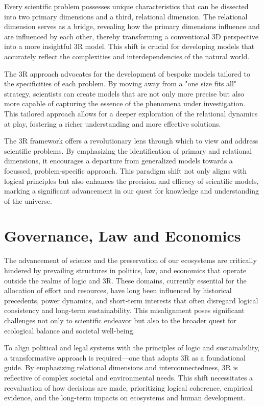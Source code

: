 \documentclass[12pt]{article}
\begin{document}
Every scientific problem possesses unique characteristics that can be dissected into two primary dimensions and a third, relational dimension. The relational dimension serves as a bridge, revealing how the primary dimensions influence and are influenced by each other, thereby transforming a conventional 3D perspective into a more insightful 3R model. This shift is crucial for developing models that accurately reflect the complexities and interdependencies of the natural world.

The 3R approach advocates for the development of bespoke models tailored to the specificities of each problem. By moving away from a "one size fits all" strategy, scientists can create models that are not only more precise but also more capable of capturing the essence of the phenomena under investigation. This tailored approach allows for a deeper exploration of the relational dynamics at play, fostering a richer understanding and more effective solutions.

The 3R framework offers a revolutionary lens through which to view and address scientific problems. By emphasizing the identification of primary and relational dimensions, it encourages a departure from generalized models towards a focussed, problem-specific approach. This paradigm shift not only aligns with logical principles but also enhances the precision and efficacy of scientific models, marking a significant advancement in our quest for knowledge and understanding of the universe.

\section*{Governance, Law and Economics}

The advancement of science and the preservation of our ecosystems are critically hindered by prevailing structures in politics, law, and economics that operate outside the realms of logic and 3R. These domains, currently essential for the allocation of effort and resources, have long been influenced by historical precedents, power dynamics, and short-term interests that often disregard logical consistency and long-term sustainability. This misalignment poses significant challenges not only to scientific endeavor but also to the broader quest for ecological balance and societal well-being.

To align political and legal systems with the principles of logic and sustainability, a transformative approach is required—one that adopts 3R as a foundational guide. By emphasizing relational dimensions and interconnectedness, 3R is reflective of complex societal and environmental needs. This shift necessitates a reevaluation of how decisions are made, prioritizing logical coherence, empirical evidence, and the long-term impacts on ecosystems and human development.
\end{document}
